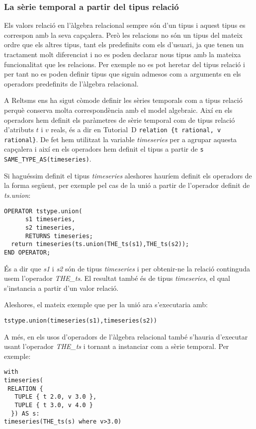 \subsubsection{La sèrie temporal a partir del tipus relació}



Els valors relació en l'àlgebra relacional sempre són d'un tipus i
aquest tipus es correspon amb la seva capçalera. Però les relacions no
són un tipus del mateix ordre que els altres tipus, tant els
predefinits com els d'usuari, ja que tenen un tractament molt
diferenciat i no es poden declarar nous tipus amb la mateixa
funcionalitat que les relacions.  Per exemple no es pot heretar del
tipus relació i per tant no es poden definir tipus que siguin admesos
com a arguments en els operadors predefinits de l'àlgebra relacional.


A Reltsms ens ha sigut còmode definir les sèries temporals com a tipus
relació perquè conserva molta correspondència amb el model algebraic.
Així en els operadors hem definit els paràmetres de sèrie temporal com
de tipus relació d'atributs $t$ i $v$ reals, és a dir en Tutorial~D %
\lstinline[style=tutorialD]+relation {t rational, v rational}+. %
De fet hem utilitzat la variable \emph{timeseries} per a agrupar
aquesta capçalera i així en els operadors hem definit el tipus a
partir de %
\lstinline[style=tutorialD]+s SAME_TYPE_AS(timeseries)+.%


Si haguéssim definit el tipus \emph{timeseries} aleshores hauríem
definit els operadors de la forma següent, per exemple pel cas de la
unió a partir de l'operador definit de \emph{ts.union}:
\begin{lstlisting}[style=tutorialD]
OPERATOR tstype.union(
      s1 timeseries, 
      s2 timeseries, 
      RETURNS timeseries;
  return timeseries(ts.union(THE_ts(s1),THE_ts(s2));
END OPERATOR;
\end{lstlisting}

És a dir que \emph{s1} i \emph{s2} són de tipus \emph{timeseries} i
per obtenir-ne la relació continguda usem l'operador \emph{THE\_ts}. El
resultat també és de tipus \emph{timeseries}, el qual s'instancia a
partir d'un valor relació.

Aleshores, el mateix exemple que per la unió ara s'executaria amb:
\begin{lstlisting}[style=tutorialD]
tstype.union(timeseries(s1),timeseries(s2))
\end{lstlisting}

A més, en els usos d'operadors de l'àlgebra relacional també s'hauria
d'executar usant l'operador \emph{THE\_ts} i tornant a instanciar com
a sèrie temporal. Per exemple:
\begin{lstlisting}[style=tutorialD]
with
timeseries(
 RELATION {
   TUPLE { t 2.0, v 3.0 },
   TUPLE { t 3.0, v 4.0 }
  }) AS s:
timeseries(THE_ts(s) where v>3.0)
\end{lstlisting}

